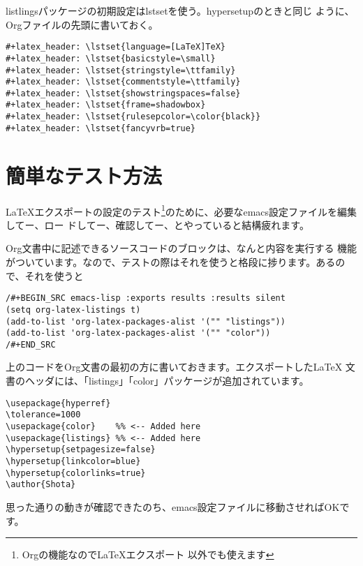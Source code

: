 \documentclass[dvipdfmx,12pt]{jsarticle}
\begin{document}
listlingsパッケージの初期設定はlstsetを使う。hypersetupのときと同じ
ように、Orgファイルの先頭に書いておく。

\lstset{language=Lisp,label= ,caption= ,numbers=none}
\begin{lstlisting}
#+latex_header: \lstset{language=[LaTeX]TeX}
#+latex_header: \lstset{basicstyle=\small}
#+latex_header: \lstset{stringstyle=\ttfamily}
#+latex_header: \lstset{commentstyle=\ttfamily}
#+latex_header: \lstset{showstringspaces=false}
#+latex_header: \lstset{frame=shadowbox}
#+latex_header: \lstset{rulesepcolor=\color{black}}
#+latex_header: \lstset{fancyvrb=true}
\end{lstlisting}




\section{簡単なテスト方法}
\label{sec-5}

\LaTeX{}エクスポートの設定のテスト\footnote{Orgの機能なので\LaTeX{}エクスポート
  以外でも使えます}のために、必要なemacs設定ファイルを編集してー、ロー
ドしてー、確認してー、とやっていると結構疲れます。

Org文書中に記述できるソースコードのブロックは、なんと内容を実行する
機能がついています。なので、テストの際はそれを使うと格段に捗ります。あるので、それを使うと

\lstset{language=Lisp,label= ,caption= ,numbers=none}
\begin{lstlisting}
/#+BEGIN_SRC emacs-lisp :exports results :results silent
(setq org-latex-listings t)
(add-to-list 'org-latex-packages-alist '("" "listings"))
(add-to-list 'org-latex-packages-alist '("" "color"))
/#+END_SRC
\end{lstlisting}

上のコードをOrg文書の最初の方に書いておきます。エクスポートした\LaTeX{}
文書のヘッダには、「listings」「color」パッケージが追加されています。

\lstset{language=[LaTeX]TeX,label= ,caption= ,numbers=none}
\begin{lstlisting}
\usepackage{hyperref}
\tolerance=1000
\usepackage{color}    %% <-- Added here
\usepackage{listings} %% <-- Added here
\hypersetup{setpagesize=false}
\hypersetup{linkcolor=blue}
\hypersetup{colorlinks=true}
\author{Shota}
\end{lstlisting}

思った通りの動きが確認できたのち、emacs設定ファイルに移動させればOKです。
\end{document}

